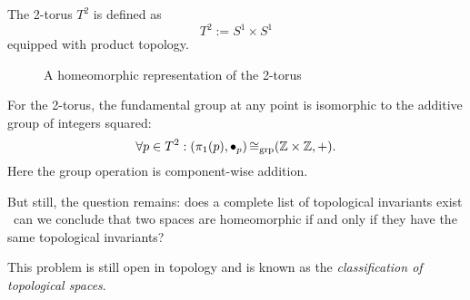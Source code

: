 \begin{example}
	The 2-torus \(T^2\) is defined as
	\begin{equation}
		T^2 := S^1 \times S^1 \label{eq:2_torus}
	\end{equation}
	equipped with product topology.
	\begin{figure}[H]
		\centering
		\caption{A homeomorphic representation of the 2-torus}
		\label{fig:2_torus}
	\end{figure} \noindent
	For the 2-torus, the fundamental group at any point is isomorphic to the additive group of integers squared:
	\begin{equation}
		\forall p \in T^2: \qty(\pi_1(p), \bullet_p) \operatorname{\cong_{\text{grp}}} (\mathbb Z \times \mathbb Z, +). \label{eq:fundamental_group_torus}
	\end{equation}
	Here the group operation is component-wise addition.
\end{example}

But still, the question remains: does a complete list of topological invariants exist \ie\ can we conclude that two spaces are homeomorphic if and only if they have the same topological invariants?

This problem is still open in topology and is known as the \emph{classification of topological spaces}.
